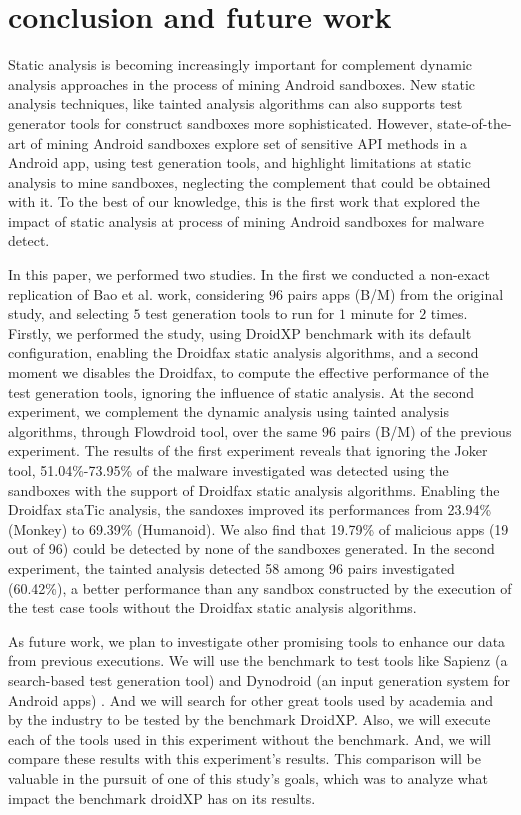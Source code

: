 \section{conclusion and future work}

Static analysis is becoming increasingly important for complement dynamic analysis approaches in the process of mining Android sandboxes. New static analysis techniques, like tainted analysis algorithms can also supports test generator tools for construct sandboxes more  sophisticated. However, state-of-the-art of mining Android sandboxes explore set of sensitive API methods in a Android app, using test generation tools, and highlight limitations at static analysis to mine sandboxes, neglecting the complement that could be obtained with it. To the best of our knowledge, this is the first work that explored the impact of static analysis at process of mining Android sandboxes for malware detect.

In this paper, we performed two studies. In the first we conducted a non-exact replication of Bao et al. work, considering $96$ pairs apps (B/M) from the original study, and selecting $5$ test generation tools to run for $1$ minute for $2$ times. Firstly, we performed the study, using DroidXP benchmark with its default configuration, enabling the Droidfax static analysis algorithms, and a second moment we disables the Droidfax, to compute the effective performance of the test generation tools, ignoring the influence of static analysis. At the second experiment, we complement the dynamic analysis using tainted analysis algorithms, through Flowdroid tool, over the same $96$ pairs (B/M) of the previous experiment. The results of the first experiment reveals that ignoring the Joker tool, 51.04\%-73.95\% of the malware investigated was detected using the sandboxes with the support of Droidfax static analysis algorithms. Enabling the Droidfax staTic analysis, the sandoxes improved its performances from 23.94\% (Monkey) to 69.39\% (Humanoid). We also find that 19.79\% of malicious apps (19 out of 96) could be detected by none of the sandboxes generated. In the second experiment, the tainted analysis detected 58 among 96 pairs investigated (60.42\%), a better performance than any sandbox constructed by the execution of the test case tools without the Droidfax static analysis algorithms.

As future work, we plan to investigate other promising tools to enhance our data from previous executions. We will use the benchmark to test tools like Sapienz (a search-based test generation tool) \cite{DBLP:conf/issta/MaoHJ16} and Dynodroid (an input generation system for Android apps) \cite{DBLP:conf/sigsoft/MachiryTN13}. And we will search for other great tools used by academia and by the industry to be tested by the benchmark DroidXP.
Also, we will execute each of the tools used in this experiment without the benchmark. And, we will compare these results with this experiment's results. This comparison will be valuable in the pursuit of one of this study's goals, which was to analyze what impact the benchmark droidXP has on its results.
